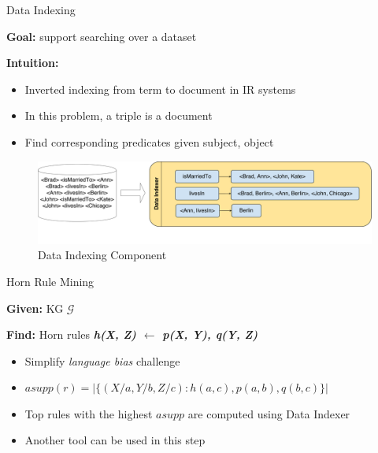 \documentclass{beamer}
\def\cG{\ensuremath{\mathcal{G}}}
\begin{document}
\begin{frame}{Data Indexing}

\textbf{Goal:} support searching over a dataset
\smallskip

\textbf{Intuition:} 
\begin{itemize}
	\item Inverted indexing from term to document in IR systems
  	\item In this problem, a triple is a document
  	\item Find corresponding predicates given subject, object
\end{itemize}

\begin{figure}[h]
	\centering
	\includegraphics[page=1,width=1.0\textwidth]{data_indexing.pdf}
	\caption{Data Indexing Component}
\end{figure}

\end{frame}

\begin{frame}{Horn Rule Mining}

\textbf{Given:} KG $\cG$
\smallskip

\textbf{Find:} Horn rules \textit{\textbf{h(X, Z) $\leftarrow$ p(X, Y), q(Y, Z)}}
\smallskip
\begin{itemize}
	\item Simplify \textit{language bias} challenge
	\item $asupp(r)=|\{(X/a, Y/b, Z/c):h(a, c),p(a, b),q(b, c)\}|$
	\item Top rules with the highest $asupp$ are computed using Data Indexer
	\item Another tool can be used in this step
\end{itemize}

\end{frame}
\end{document}
